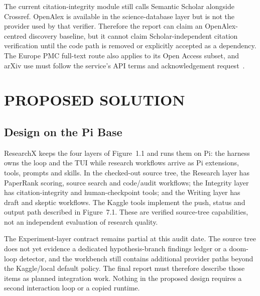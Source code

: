 \documentclass[12pt,a4paper]{report}
\numberwithin{equation}{chapter}
\begin{document}
The current citation-integrity module still calls Semantic Scholar alongside
Crossref. OpenAlex is available in the science-database layer but is not the
provider used by that verifier. Therefore the report can claim an OpenAlex-
centred discovery baseline, but it cannot claim Scholar-independent citation
verification until the code path is removed or explicitly accepted as a
dependency. The Europe PMC full-text route also applies to its Open Access
subset, and arXiv use must follow the service's API terms and acknowledgement
request~\cite{arxiv}.

\chapter{PROPOSED SOLUTION}

\section{Design on the Pi Base}
ResearchX keeps the four layers of Figure~1.1 and runs them on Pi: the
harness owns the loop and the TUI while research workflows arrive as Pi
extensions, tools, prompts and skills. In the checked-out source tree, the
Research layer has PaperRank scoring, source search and code/audit workflows;
the Integrity layer has citation-integrity and human-checkpoint tools; and the
Writing layer has draft and skeptic workflows. The Kaggle tools implement the
push, status and output path described in Figure~7.1. These are verified
source-tree capabilities, not an independent evaluation of research quality.

The Experiment-layer contract remains partial at this audit date. The source
tree does not yet evidence a dedicated hypothesis-branch findings ledger or a
doom-loop detector, and the workbench still contains additional provider
paths beyond the Kaggle/local default policy. The final report must therefore
describe those items as planned integration work. Nothing in the proposed
design requires a second interaction loop or a copied runtime.
\end{document}

